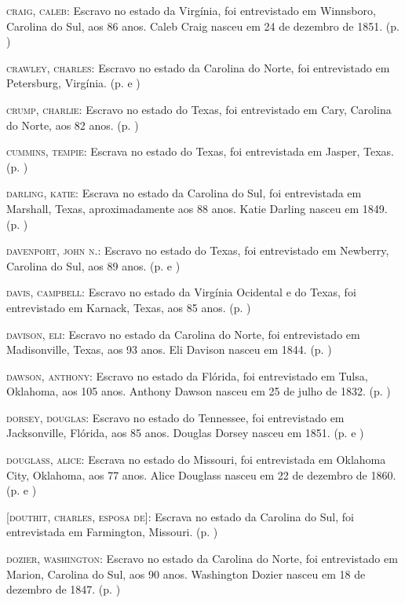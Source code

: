 \begin{Parskip}
\textsc{craig, caleb:} Escravo no estado da Virgínia, foi entrevistado
em Winnsboro, Carolina do Sul, aos 86 anos. Caleb Craig nasceu em 24 de
dezembro de 1851. (p. \pageref{ref60})

\textsc{crawley, charles:} Escravo no estado da Carolina do Norte, foi
entrevistado em Petersburg, Virgínia. (p. \pageref{ref61} e \pageref{ref62})

\textsc{crump, charlie:} Escravo no estado do Texas, foi entrevistado em
Cary, Carolina do Norte, aos 82 anos. (p. \pageref{ref63})

\textsc{cummins, tempie:} Escrava no estado do Texas, foi entrevistada
em Jasper, Texas. (p. \pageref{ref64})

\textsc{darling, katie:} Escrava no estado da Carolina do Sul, foi
entrevistada em Marshall, Texas, aproximadamente aos 88 anos. Katie
Darling nasceu em 1849. (p. \pageref{ref65})

\textsc{davenport, john n.:} Escravo no estado do Texas, foi
entrevistado em Newberry, Carolina do Sul, aos 89 anos. (p. \pageref{ref66} e \pageref{ref67})

\textsc{davis, campbell:} Escravo no estado da Virgínia Ocidental e do
Texas, foi entrevistado em Karnack, Texas, aos 85 anos. (p. \pageref{ref68})

\textsc{davison, eli:} Escravo no estado da Carolina do Norte, foi
entrevistado em Madisonville, Texas, aos 93 anos. Eli Davison nasceu em
1844. (p. \pageref{ref69})

\textsc{dawson, anthony:} Escravo no estado da Flórida, foi entrevistado
em Tulsa, Oklahoma, aos 105 anos. Anthony Dawson nasceu em 25 de julho
de 1832. (p. \pageref{ref70})

\textsc{dorsey, douglas:} Escravo no estado do Tennessee, foi
entrevistado em Jacksonville, Flórida, aos 85 anos. Douglas Dorsey
nasceu em 1851. (p. \pageref{ref71} e \pageref{ref72})

\textsc{douglass, alice:} Escrava no estado do Missouri, foi
entrevistada em Oklahoma City, Oklahoma, aos 77 anos. Alice Douglass
nasceu em 22 de dezembro de 1860. (p. \pageref{ref73} e \pageref{ref74})

\textsc{{[}douthit, charles, esposa de{]}:} Escrava no estado da
Carolina do Sul, foi entrevistada em Farmington, Missouri. (p. \pageref{ref75})

\textsc{dozier, washington:} Escravo no estado da Carolina do Norte, foi
entrevistado em Marion, Carolina do Sul, aos 90 anos. Washington Dozier
nasceu em 18 de dezembro de 1847. (p. \pageref{ref76})


\end{Parskip}
